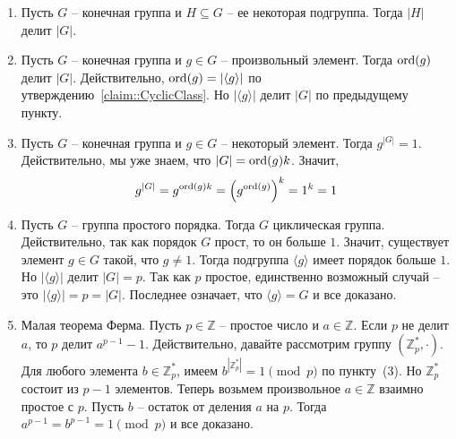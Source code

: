 \begin{enumerate}
\item Пусть $G$ -- конечная группа и $H\subseteq G$ -- ее некоторая подгруппа.
Тогда $|H|$ делит $|G|$.

\item Пусть $G$ -- конечная группа и $g\in G$ -- произвольный элемент.
Тогда $\operatorname{ord}(g)$ делит $|G|$.
Действительно, $\operatorname{ord}(g) = |\langle g \rangle|$ по утверждению~\ref{claim::CyclicClass}.
Но $|\langle g\rangle|$ делит $|G|$ по предыдущему пункту.

\item Пусть $G$ -- конечная группа и $g\in G$ -- некоторый элемент.
Тогда $g^{|G|} = 1$.
Действительно, мы уже знаем, что $|G| = \operatorname{ord}(g) k$.
Значит, 
\[
g^{|G|} = g^{\operatorname{ord}(g)k} = \left(g^{\operatorname{ord}(g)}\right)^{k} = 1^k = 1
\]

\item Пусть $G$ -- группа простого порядка.
Тогда $G$ циклическая группа.
Действительно, так как порядок $G$ прост, то он больше $1$.
Значит, существует элемент $g\in G$ такой, что $g\neq 1$.
Тогда подгруппа $\langle g\rangle$ имеет порядок больше $1$.
Но $|\langle g \rangle|$ делит $|G| = p$.
Так как $p$ простое, единственно возможный случай -- это $|\langle g \rangle| = p = |G|$.
Последнее означает, что $\langle g \rangle = G$ и все доказано.

\item Малая теорема Ферма.
Пусть $p\in \mathbb Z$ -- простое число и $a\in \mathbb Z$.
Если $p$ не делит $a$,  то $p$ делит $a^{p-1}-1$.
Действительно, давайте рассмотрим группу $(\mathbb Z_p^*, \cdot)$.
Для любого элемента $b\in \mathbb Z_p^*$, имеем $b^{|\mathbb Z_p^*|} = 1 \pmod p$ по пункту~(3).
Но $\mathbb Z_p^*$ состоит из $p-1$ элементов.
Теперь возьмем произвольное $a\in \mathbb Z$ взаимно простое с $p$.
Пусть $b$ -- остаток от деления $a$ на $p$.
Тогда $a^{p-1} = b^{p-1} = 1\pmod p$ и все доказано.
\end{enumerate}
